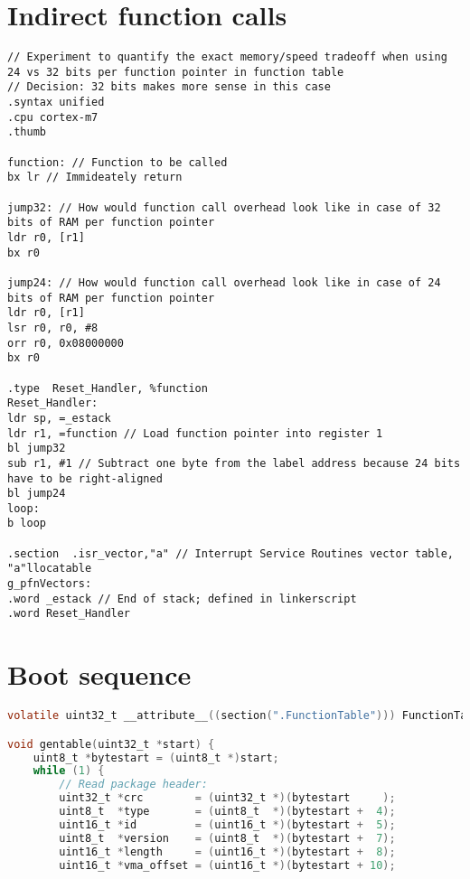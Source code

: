 \newpage

\begin{appendices}
\printglossaries

\newpage
\section{Indirect function calls}
\label{apx:calls}
\begin{lstlisting}[style=asm]
// Experiment to quantify the exact memory/speed tradeoff when using 24 vs 32 bits per function pointer in function table
// Decision: 32 bits makes more sense in this case
.syntax unified
.cpu cortex-m7
.thumb

function: // Function to be called
bx lr // Immideately return

jump32: // How would function call overhead look like in case of 32 bits of RAM per function pointer
ldr r0, [r1]
bx r0

jump24: // How would function call overhead look like in case of 24 bits of RAM per function pointer
ldr r0, [r1]
lsr r0, r0, #8
orr r0, 0x08000000
bx r0

.type  Reset_Handler, %function
Reset_Handler:
ldr sp, =_estack
ldr r1, =function // Load function pointer into register 1
bl jump32
sub r1, #1 // Subtract one byte from the label address because 24 bits have to be right-aligned
bl jump24
loop:
b loop

.section  .isr_vector,"a" // Interrupt Service Routines vector table, "a"llocatable
g_pfnVectors:
.word _estack // End of stack; defined in linkerscript
.word Reset_Handler
\end{lstlisting}


\newpage
\section{Boot sequence}
\label{apx:gentable}
\begin{lstlisting}[language=C]
volatile uint32_t __attribute__((section(".FunctionTable"))) FunctionTable[255]; // Table of function pointers

void gentable(uint32_t *start) {
	uint8_t *bytestart = (uint8_t *)start;
	while (1) {
		// Read package header:
		uint32_t *crc        = (uint32_t *)(bytestart     );
		uint8_t  *type       = (uint8_t  *)(bytestart +  4);
		uint16_t *id         = (uint16_t *)(bytestart +  5);
		uint8_t  *version    = (uint8_t  *)(bytestart +  7);
		uint16_t *length     = (uint16_t *)(bytestart +  8);
		uint16_t *vma_offset = (uint16_t *)(bytestart + 10);


\end{lstlisting}
\end{appendices}
